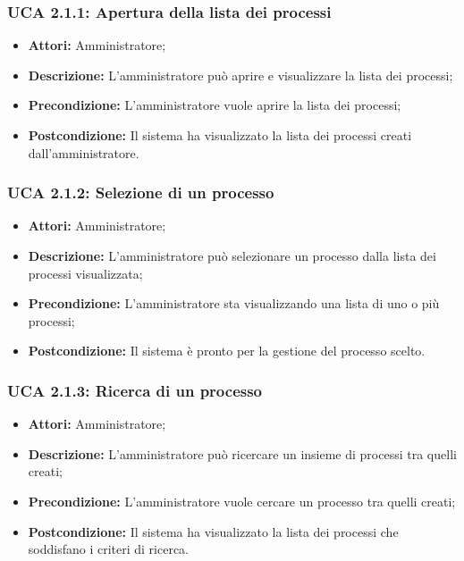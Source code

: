 \subsubsection{UCA 2.1.1: Apertura della lista dei processi}
\begin{itemize}
\item \textbf{Attori:} Amministratore;
\item \textbf{Descrizione:} L'amministratore può aprire e visualizzare la lista dei processi;
\item \textbf{Precondizione:} L'amministratore vuole aprire la lista dei processi;
\item \textbf{Postcondizione:} Il sistema ha visualizzato la lista dei processi creati dall'amministratore.
\end{itemize}

\hypertarget{A2.1.2}{}
\subsubsection{UCA 2.1.2: Selezione di un processo}
\begin{itemize}
\item \textbf{Attori:} Amministratore;
\item \textbf{Descrizione:} L'amministratore può selezionare un processo dalla lista dei processi visualizzata;
\item \textbf{Precondizione:} L'amministratore sta visualizzando una lista di uno o più processi;
\item \textbf{Postcondizione:} Il sistema è pronto per la gestione del processo scelto.
\end{itemize}

\hypertarget{A2.1.3}{}
\subsubsection{UCA 2.1.3: Ricerca di un processo}
\begin{itemize}
\item \textbf{Attori:} Amministratore;
\item \textbf{Descrizione:} L'amministratore può ricercare un insieme di processi tra quelli creati;
\item \textbf{Precondizione:} L'amministratore vuole cercare un processo tra quelli creati;
\item \textbf{Postcondizione:} Il sistema ha visualizzato la lista dei processi che soddisfano i criteri di ricerca.
\end{itemize}

